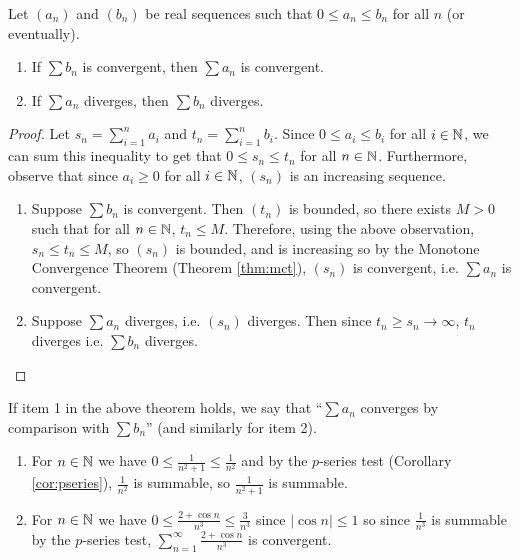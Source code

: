 \documentclass[../analysis1.tex]{subfiles}
\begin{document}
\begin{theorem}
\label{thm:comparisontest}
    \begin{shaded*}
        Let $(a_n)$ and $(b_n)$ be real sequences such that $0 \le a_n \le b_n$ for all $n$ (or eventually). 
        \begin{enumerate}
            \item[1.] If $\sum b_n$ is convergent, then $\sum a_n$ is convergent.
            \item[2.] If $\sum a_n$ diverges, then $\sum b_n$ diverges.
        \end{enumerate}
    \end{shaded*}
\end{theorem}

\begin{proof}
    Let $s_n=\sum_{i=1}^na_i$ and $t_n=\sum_{i=1}^nb_i$. Since $0\le a_i\le b_i$ for all $i\in\mathbb{N}$, we can sum this inequality to get that $0\le s_n\le t_n$ for all $n\in\mathbb{N}$. Furthermore, observe that since $a_i\ge 0$ for all $i\in\mathbb{N}$, $(s_n)$ is an increasing sequence.
    \begin{enumerate}
        \item[1.] Suppose $\sum b_n$ is convergent. Then $(t_n)$ is bounded, so there exists $M>0$ such that for all $n\in\mathbb{N}$, $t_n\le M$. Therefore, using the above observation, $s_n\le t_n\le M$, so $(s_n)$ is bounded, and is increasing so by the Monotone Convergence Theorem (Theorem \ref{thm:mct}), $(s_n)$ is convergent, i.e. $\sum a_n$ is convergent.
        \item[2.] Suppose $\sum a_n$ diverges, i.e. $(s_n)$ diverges. Then since $\allowbreak t_n\ge s_n\to\infty$, $t_n$ diverges i.e. $\sum b_n$ diverges.\qedhere 
    \end{enumerate}
\end{proof}
\begin{remark}
    If item 1 in the above theorem holds, we say that ``$\sum a_n$ converges by comparison with $\sum b_n$'' (and similarly for item 2). 
\end{remark}
\begin{example}
    \begin{enumerate}
        \item[1.] For $n\in\mathbb{N}$ we have $0\le \frac{1}{n^2+1}\le \frac{1}{n^2}$ and by the $p$-series test (Corollary \ref{cor:pseries}), $\frac{1}{n^2}$ is summable, so $\frac{1}{n^2+1}$ is summable.
        \item[2.] For $n\in\mathbb{N}$ we have $0\le \frac{2+\cos n}{n^3}\le \frac{3}{n^3}$ since $|\cos n|\le 1$ so since $\frac{1}{n^3}$ is summable by the $p$-series test, $\sum_{n=1}^{\infty}\frac{2+\cos n}{n^3}$ is convergent. 
    \end{enumerate}
\end{example}
\end{document}
